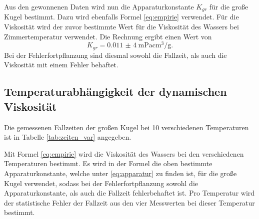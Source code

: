Aus den gewonnenen Daten wird nun die Apparaturkonstante $K_{gr}$ für
die große Kugel bestimmt.  Dazu wird ebenfalls Formel \eqref{eq:empirie}
verwendet. Für die Viskosität wird der zuvor bestimmte Wert für die
Viskosität des Wassers bei Zimmertemperatur verwendet.  Die Rechnung
ergibt einen Wert von
\begin{equation}
\label{eq:apparatur}
K_{gr} = \SI{0,011(4)}{\milli\pascal\centi\metre^3\per\gram}.
\end{equation}
Bei der Fehlerfortpflanzung sind diesmal sowohl die Fallzeit, als auch die Viskosität mit einem Fehler behaftet.
%
\subsection{Temperaturabhängigkeit der dynamischen Viskosität}
%
Die gemessenen Fallzeiten der großen Kugel bei 10 verschiedenen Temperaturen ist in Tabelle \ref{tab:zeiten_var} angegeben.

Mit Formel \eqref{eq:empirie} wird die Viskosität des Wassers bei den
verschiedenen Temperaturen bestimmt. Es wird in der Formel die oben
bestimmte Apparaturkonstante, welche unter \eqref{eq:apparatur} zu finden ist, für die große Kugel verwendet, sodass bei der Fehlerfortpflanzung sowohl die Apparaturkonstante, als auch die
Fallzeit fehlerbehaftet ist. Pro Temperatur wird der statistische Fehler
der Fallzeit aus den vier Messwerten bei dieser Temperatur bestimmt.

